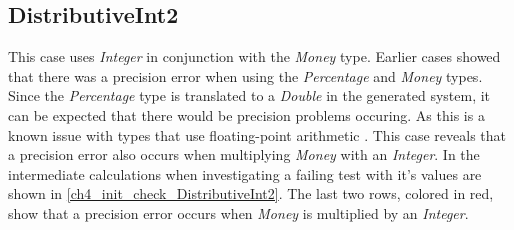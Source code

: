 \subsection{DistributiveInt2}
\label{ssct:ch5_distributiveInt2}
This case uses \textit{Integer} in conjunction with the \textit{Money} type. Earlier cases showed that there was a precision error when using the \textit{Percentage} and \textit{Money} types. Since the \textit{Percentage} type is translated to a \textit{Double} in the generated system, it can be expected that there would be precision problems occuring. As this is a known issue with types that use floating-point arithmetic \cite{goldberg1991every}. This case reveals that a precision error also occurs when multiplying \textit{Money} with an \textit{Integer}. In the intermediate calculations when investigating a failing test with it's values are shown in \autoref{ch4_init_check_DistributiveInt2}. The last two rows, colored in red, show that a precision error occurs when \textit{Money} is multiplied by an \textit{Integer}.
\\
